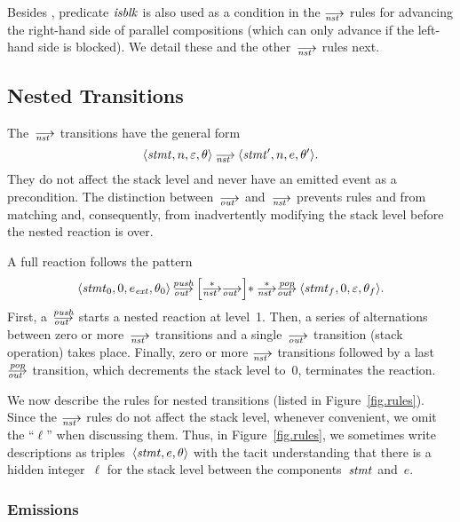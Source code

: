 Besides , predicate $\mathop{\mathit{isblk}}$ is also used as a condition in the
$\nst$ rules for advancing the right-hand side of parallel compositions
(which can only advance if the left-hand side is blocked).  We detail these
and the other~$\nst$ rules next.




\subsection{Nested Transitions}
\label{sec.sem.nested}

The~$\nst$ transitions have the general form
\[
\<\stmt,n,\nil,\theta>\nst\<\stmt',n,e,\theta'>.
\]
They do not affect the stack level and never have an emitted event as a
precondition.  The distinction between~$\out$ and~$\nst$ prevents rules
 and  from matching and, consequently, from inadvertently
modifying the stack level before the nested reaction is over.

A full reaction follows the pattern
\begin{align*}
  \<\stmt_0,0,e_\ext,\theta_0>\outpush
  {\Big[{\nst[*]}{\out}\Big]{*}}
  \null\mathbin{\nst[*]\outpop}\<\stmt_f,0,\nil,\theta_f>.
\end{align*}
First, a~$\outpush$ starts a nested reaction at level~1.  Then, a series of
alternations between zero or more~$\nst$ transitions and a single~$\out$
transition (stack operation) takes place.  Finally, zero or more $\nst$
transitions followed by a last~$\outpop$ transition, which decrements the
stack level to~0, terminates the reaction.

We now describe the rules for nested transitions (listed in
Figure~\ref{fig.rules}).  Since the $\nst$ rules do not affect the stack
level, whenever convenient, we omit the ``$\ell$'' when discussing them.
Thus, in Figure~\ref{fig.rules}, we sometimes write descriptions as
triples~$\<\stmt,e,\theta>$ with the tacit understanding that there is a
hidden integer~$\ell$ for the stack level between the components~$\mathit{stmt}$
and~$e$.

\subsubsection*{Emissions}

